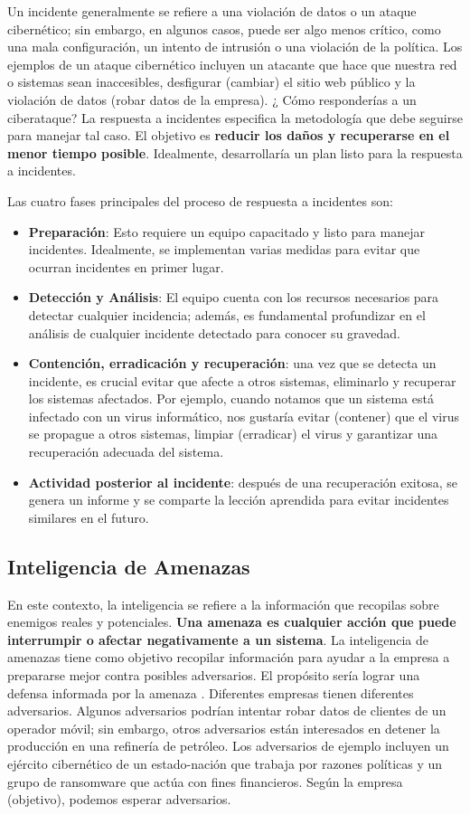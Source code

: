 Un incidente generalmente se refiere a una violación de datos o un ataque cibernético; sin embargo, en algunos casos, puede ser algo menos crítico, como una mala configuración, un intento de intrusión o una violación de la política. Los ejemplos de un ataque cibernético incluyen un atacante que hace que nuestra red o sistemas sean inaccesibles, desfigurar (cambiar) el sitio web público y la violación de datos (robar datos de la empresa). ¿ Cómo responderías a un ciberataque? La respuesta a incidentes especifica la metodología que debe seguirse para manejar tal caso. El objetivo es \textbf{reducir los daños y recuperarse en el menor tiempo posible}. Idealmente, desarrollaría un plan listo para la respuesta a incidentes.

Las cuatro fases principales del proceso de respuesta a incidentes son:

\begin{itemize}
\item \textbf{Preparación}: Esto requiere un equipo capacitado y listo para manejar incidentes. Idealmente, se implementan varias medidas para evitar que ocurran incidentes en primer lugar.
\item \textbf{Detección y Análisis}: El equipo cuenta con los recursos necesarios para detectar cualquier incidencia; además, es fundamental profundizar en el análisis de cualquier incidente detectado para conocer su gravedad.
\item \textbf{Contención, erradicación y recuperación}: una vez que se detecta un incidente, es crucial evitar que afecte a otros sistemas, eliminarlo y recuperar los sistemas afectados. Por ejemplo, cuando notamos que un sistema está infectado con un virus informático, nos gustaría evitar (contener) que el virus se propague a otros sistemas, limpiar (erradicar) el virus y garantizar una recuperación adecuada del sistema.
\item \textbf{Actividad posterior al incidente}: después de una recuperación exitosa, se genera un informe y se comparte la lección aprendida para evitar incidentes similares en el futuro.
\end{itemize}

\subsection{Inteligencia de Amenazas}

En este contexto, la inteligencia se refiere a la información que recopilas sobre enemigos reales y potenciales. \textbf{Una amenaza es cualquier acción que puede interrumpir o afectar negativamente a un sistema}. La inteligencia de amenazas tiene como objetivo recopilar información para ayudar a la empresa a prepararse mejor contra posibles adversarios. El propósito sería lograr una defensa informada por la amenaza . Diferentes empresas tienen diferentes adversarios. Algunos adversarios podrían intentar robar datos de clientes de un operador móvil; sin embargo, otros adversarios están interesados en detener la producción en una refinería de petróleo. Los adversarios de ejemplo incluyen un ejército cibernético de un estado-nación que trabaja por razones políticas y un grupo de ransomware que actúa con fines financieros. Según la empresa (objetivo), podemos esperar adversarios.

